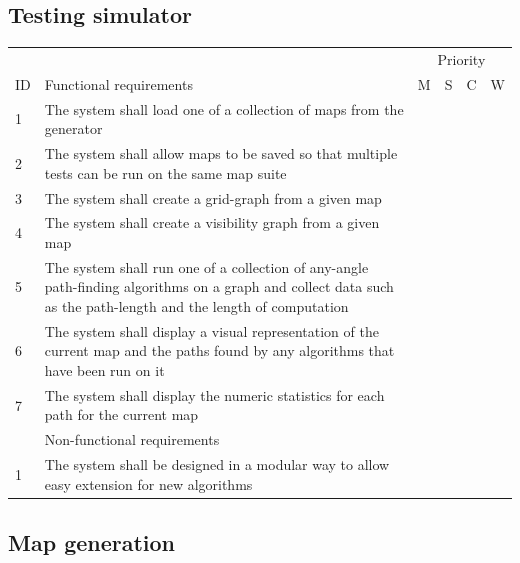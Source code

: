\documentclass[12pt,notitlepage]{report}
\begin{document}
\subsection{Testing simulator}

\begin{center}
\begin{tabular}{@{}l p{10cm} cccc} \toprule
\multicolumn{2}{r}{~} &\multicolumn{4}{c}{Priority} \\ 
\cmidrule(l){3-6}
ID & Functional requirements & M & S & C & W  \\ \midrule
    1 & The system shall load one of a collection of maps from the generator & \cellcolor{green!60} & ~ & ~ & ~\\
    2 & The system shall allow maps to be saved so that multiple tests can be run on the same map suite & ~ & \cellcolor{yellow!80} & ~ & ~ \\    
   3 & The system shall create a grid-graph from a given map & \cellcolor{green!60} & ~ & ~ & ~\\
   4 & The system shall create a visibility graph from a given map & ~ & ~ & \cellcolor{orange!60} & ~\\
   5 & The system shall run one of a collection of any-angle path-finding algorithms on a graph and collect data such as the path-length and the length of computation & \cellcolor{green!60} & ~ & ~ & ~\\
    6 & The system shall display a visual representation of the current map and the paths found by any algorithms that have been run on it & \cellcolor{green!60} & ~ & ~ & ~\\
    7 & The system shall display the numeric statistics for each path for the current map & \cellcolor{green!60} & ~ & ~ & ~\\
    \midrule
    ~ & Non-functional requirements & \multicolumn{4}{r}{}  \\ \midrule
    1 & The system shall be designed in a modular way to allow easy extension for new algorithms & ~ & \cellcolor{yellow!80} & ~ & ~ \\  \bottomrule
\end{tabular}
\end{center}

\subsection{Map generation}
\end{document}

